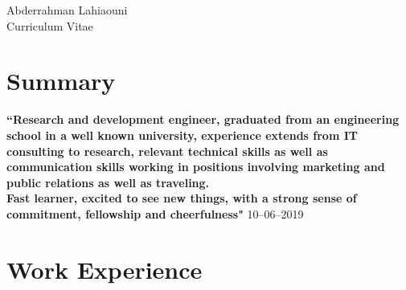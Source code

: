 \documentclass[10pt]{article} %
\begin{document}
\begin{paracol}{2} %


\parbox[top][0.12\textheight][c]{\linewidth}{ %
	\vspace{-0.04\textheight} %
	\centering %
	{\sffamily\Huge Abderrahman Lahiaouni}\\\medskip %
	{\Huge\color{headings}\cvtextfont Curriculum Vitae}
}




\section{Summary}

{\raggedright\textbf{``Research and development engineer, graduated from an engineering school in a well known university, experience extends from IT consulting to research, relevant technical skills as well as communication skills working in positions involving marketing and public relations as well as traveling. \\ Fast learner, excited to see new things, with a strong sense of commitment, fellowship and cheerfulness"} 10--06--2019\\\medskip}


\medskip %


\section{Work Experience}



\end{paracol}
\end{document}
